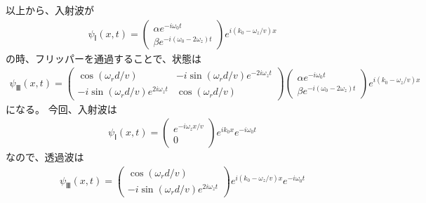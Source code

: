 以上から、入射波が
\begin{align}
{\psi}_{Ⅰ}(x,t)=
\begin{pmatrix}
{\alpha}e^{-i\omega_{0}t} \\
{\beta}e^{-i(\omega_{0}-2\omega_{z})t}
\end{pmatrix}
e^{i(k_{0}-\omega_{z}/v)x}
\end{align}
の時、フリッパーを通過することで、状態は
\begin{align}
{\psi}_{Ⅲ}(x,t) 
=
\begin{pmatrix}
\cos({{\omega_{r}}d/v}) &-i\sin({{\omega_{r}}d/v})e^{-2i\omega_{z}t} \\
-i\sin({{\omega_{r}}d/v})e^{2i\omega_{z}t} &\cos({{\omega_{r}}d/v})
\end{pmatrix}\begin{pmatrix}
{\alpha}e^{-i\omega_{0}t} \\
{\beta}e^{-i(\omega_{0}-2\omega_{z})t}
\end{pmatrix}
e^{i(k_{0}-\omega_{z}/v)x}
\end{align}
になる。
今回、入射波は
\begin{align}
{\psi}_{Ⅰ}(x,t)=
\begin{pmatrix}
e^{-i\omega_{z}x/v} \\
0
\end{pmatrix}
e^{ik_{0}x}e^{-i\omega_{0}t}
\end{align}
なので、透過波は
\begin{align}
{\psi}_{Ⅲ}(x,t)=
\begin{pmatrix}
\cos({{\omega_{r}}d/v}) \\
-i\sin({{\omega_{r}}d/v})e^{2i\omega_{z}t}
\end{pmatrix}
e^{i(k_{0}-\omega_{z}/v)x}e^{-i\omega_{0}t}
\end{align}







